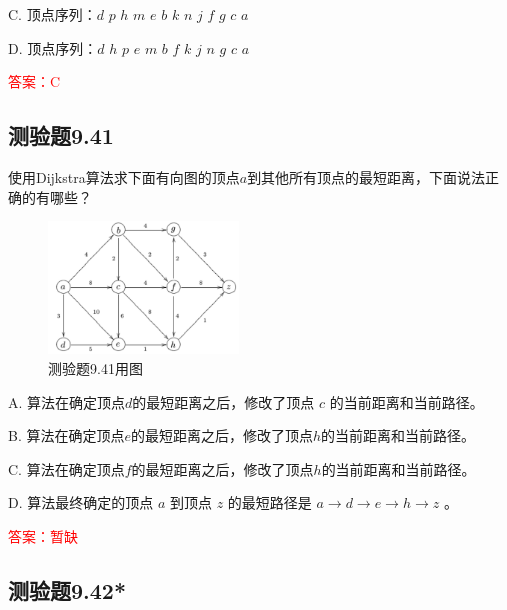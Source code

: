 \documentclass[UTF8, heading=true]{ctexart}
\begin{document}
C. 顶点序列：$d$ \quad $p$ \quad $h$ \quad $m$ \quad $e$ \quad $b$ \quad $k$ \quad $n$ \quad $j$ \quad $f$ \quad $g$ \quad $c$ \quad $a$

D. 顶点序列：$d$ \quad $h$ \quad $p$ \quad $e$ \quad $m$ \quad $b$ \quad $f$ \quad $k$ \quad $j$ \quad $n$ \quad $g$ \quad $c$ \quad $a$



\textcolor{red}{答案：C}

\subsection{测验题9.41}

使用Dijkstra算法求下面有向图的顶点$a$到其他所有顶点的最短距离，下面说法正确的有哪些？

\begin{figure}[H]
  \centering
  \includegraphics[width=0.45\textwidth]{9.43.jpg} %
  \caption{测验题9.41用图}
\end{figure}

A. 算法在确定顶点$d$的最短距离之后，修改了顶点 $c$ 的当前距离和当前路径。

B. 算法在确定顶点$e$的最短距离之后，修改了顶点$h$的当前距离和当前路径。

C. 算法在确定顶点$f$的最短距离之后，修改了顶点$h$的当前距离和当前路径。

D. 算法最终确定的顶点 $a$ 到顶点 $z$ 的最短路径是 $a \rightarrow d \rightarrow e \rightarrow h \rightarrow z$ 。


\textcolor{red}{答案：暂缺}

\subsection{测验题9.42*}
\end{document}
